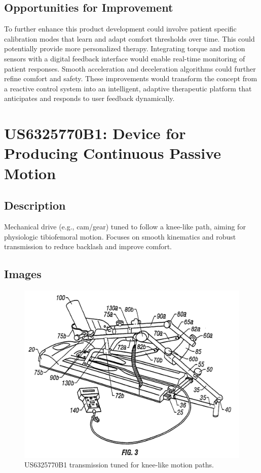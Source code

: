 \documentclass[11pt]{article}
\begin{document}
\subsection{Opportunities for Improvement}
To further enhance this product development could involve patient specific calibration modes that learn and adapt comfort thresholds over time. This could potentially provide more personalized therapy. Integrating torque and motion sensors with a digital feedback interface would enable real-time monitoring of patient responses. Smooth acceleration and deceleration algorithms could further refine comfort and safety. These improvements would transform the concept from a reactive control system into an intelligent, adaptive therapeutic platform that anticipates and responds to user feedback dynamically.

\section{US6325770B1: Device for Producing Continuous Passive Motion}
\subsection{Description}
Mechanical drive (e.g., cam/gear) tuned to follow a knee-like path, aiming for physiologic tibiofemoral motion. Focuses on smooth kinematics and robust transmission to reduce backlash and improve comfort.
\subsection{Images}
\begin{figure}[H]
  \centering
  \includegraphics[width=0.54\linewidth]{US6325770B1_1.png}
  \caption{US6325770B1 transmission tuned for knee-like motion paths.}
  \label{fig:US6325770B1}
\end{figure}
\end{document}
